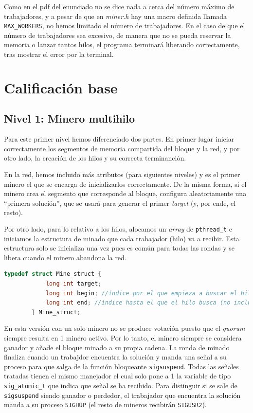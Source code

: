 \documentclass{article}
\begin{document}
Como en el pdf del enunciado no se dice nada a cerca del número máximo de trabajadores, y a pesar de que en \emph{miner.h} hay una macro definida llamada \texttt{MAX\_WORKERS}, no hemos limitado el número de trabajadores. En el caso de que el número de trabajadores sea excesivo, de manera que no se pueda reservar la memoria o lanzar tantos hilos, el programa terminará liberando correctamente, tras mostrar el error por la terminal.



\section*{Calificación base}

\subsection*{Nivel 1: Minero multihilo}

    Para este primer nivel hemos diferenciado dos partes. En primer lugar iniciar correctamente los segmentos de memoria compartida del bloque y la red, y por otro lado, la creación de los hilos y su correcta terminanción. 

    En la red, hemos incluido más atributos (para siguientes niveles) y es el primer minero el que se encarga de inicializarlos correctamente.
    De la misma forma, si el minero crea el segmento que corresponde al bloque, configura aleatoriamente una ``primera solución'', que se usará para generar el primer \textit{target} (y, por ende, el resto).

    Por otro lado, para lo relativo a los hilos, alocamos un \textit{array} de \texttt{pthread\_t} e iniciamos la estructura de minado que cada trabajador (hilo) va a recibir. Esta estructura solo se inicializa una vez pues es común para todas las rondas y se libera cuando el minero abandona la red. 
    
    \begin{lstlisting}[language=C, texcl=true]
        typedef struct Mine_struct_{
            long int target;
            long int begin; //índice por el que empieza a buscar el hilo
            long int end; //índice hasta el que el hilo busca (no incluido)
        } Mine_struct;  \end{lstlisting}


    En esta versión con un solo minero no se produce votación puesto que el \textit{quorum} siempre resulta en 1 minero activo. Por lo tanto, el minero siempre se considera ganador y añade el bloque minado a su propia cadena. La ronda de minado finaliza cuando un trabajdor encuentra la solución y manda una señal a su proceso para que salga de la función bloqueante \texttt{sigsuspend}. Todas las señales tratadas tienen el mismo manejador el cual solo pone a 1 la variable de tipo \texttt{sig\_atomic\_t} que indica que señal se ha recibido. Para distinguir si se sale de \texttt{sigsuspend} siendo ganador o perdedor, el trabajador que encuentra la solución manda a su proceso \texttt{SIGHUP} (el resto de mineros recibirán \texttt{SIGUSR2}).
\end{document}
